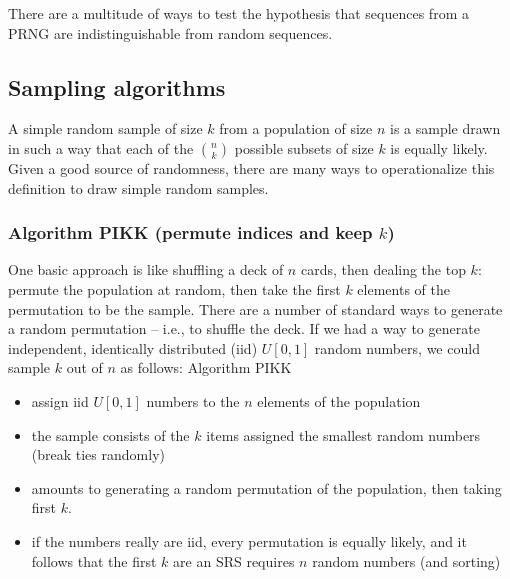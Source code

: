 \documentclass[12pt]{article}
\newcommand{\todo}[1]{{\color{red}{TO DO: \sc #1}}}
\begin{document}
There are a multitude of ways to test the hypothesis that sequences from a PRNG are indistinguishable 
from random sequences.
\todo{list types of tests + citations: L'Ecuyer Simard TestU01 (2007),  Knuth (1969), Marsaglia DIEHARD tests (1968), NIST tests

\begin{itemize}
\item Two notions of uniformity: 1) uniformly distributed within a sequence with a fixed starting state, 2) the set of sequences of length $t$ that can be hit by the PRNG should be uniformly distributed among the set of all sequences of length $t$ -- this gets at the SRS problem
\end{itemize}
}

\subsection{Sampling algorithms}
A simple random sample of size $k$ from a population of size $n$ is a sample drawn in such a way that each of the ${n \choose k}$ possible subsets of size $k$ is equally likely.
Given a good source of randomness, there are many ways to operationalize this definition to draw simple random samples.
\subsubsection{Algorithm PIKK (permute indices and keep $k$)}
One basic approach is like shuffling a deck of $n$ cards, then dealing the top $k$: permute the population at random, then take the first $k$ elements of the permutation to be the sample.
There are a number of standard ways to generate a random permutation -- i.e., to shuffle the deck.
If we had a way to generate independent, identically distributed (iid) $U[0,1]$ random numbers, we could sample $k$ out of $n$ as follows:
\todo{create an algorithm environment}
Algorithm PIKK
\begin{itemize}
\item assign iid $U[0,1]$ numbers to the $n$ elements of the population
\item the sample consists of the $k$ items assigned the smallest random numbers (break ties randomly)
\item amounts to generating a random permutation of the population, then taking first $k$.
\item if the numbers really are iid, every permutation is equally likely, and it follows that the first $k$ are an SRS
requires $n$ random numbers (and sorting)
\end{itemize}
\end{document}
